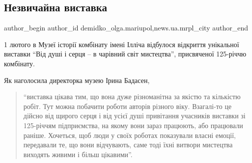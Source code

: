  
 
 
 
 
 
\subsection{Незвичайна виставка}
\label{sec:06_02_2022.stz.news.ua.mrpl_city.1.nezvychajna_vystavka}
 
\ifcmt
 author_begin
   author_id demidko_olga.mariupol,news.ua.mrpl_city
 author_end
\fi

1 лютого в Музеї історії комбінату імені Ілліча відбулося відкриття  унікальної
виставки \enquote{Від душі і серця – в чарівний світ мистецтва}, присвяченої 125-річчю
комбінату.

Як наголосила директорка музею Ірина Бадасен, 

\begin{quote}
\enquote{виставка цікава тим, що вона
дуже різноманітна за якістю та кількістю робіт. Тут можна побачити роботи
авторів різного віку. Взагалі-то це дійсно від щирого серця і від усієї душі
привітання учасників виставки зі 125-річчям підприємства, на якому вони зараз
працюють, або працювали раніше. Хочеться, щоб люди у своїх роботах показували
власні емоції, передавали те, що вони відчувають, саме тоді їхні витвори
мистецтва виходять живими і більш цікавими}.
\end{quote}


